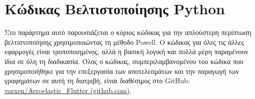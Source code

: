 \appendix
\chapter{Κώδικας Βελτιστοποίησης \textlatin{Python} }
\label{appendix}

Στο παράρτημα αυτό παρουσιάζεται ο κύριος κώδικας για την απλούστερη περίπτωση βελτιστοποίησης χρησιμοποιώντας τη μέθοδο \textlatin{Powell}. Ο κώδικας για όλες τις άλλες εφαρμογές είναι τροποποιημένος, αλλά η βασική λογική και πολλά μέρη παραμένουν ίδια σε όλη τη διαδικασία. Όλος ο κώδικας, συμπεριλαμβανομένου του κώδικα που χρησιμοποιήθηκε για την επεξεργασία των αποτελεσμάτων και την παραγωγή των γραφημάτων σε αυτή τη διατριβή, είναι διαθέσιμος στο \textlatin{GitHub}: \href{https://github.com/vasxen/Aeroelastic_Flutter}{\textlatin{vasxen/Aeroelastic\_Flutter (github.com)}}.



